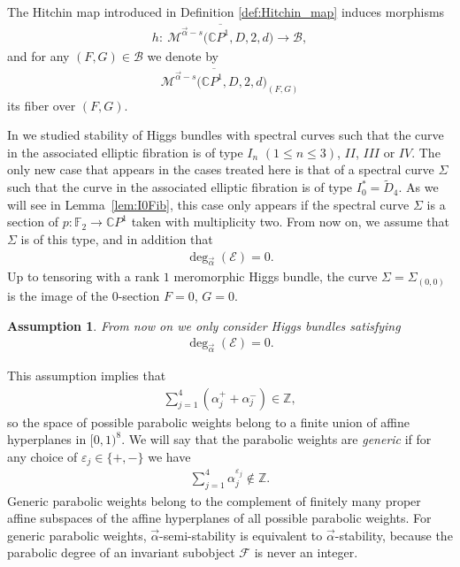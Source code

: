 \documentclass[pdftex]{sigma}
\newcommand{\Z}{{\mathbb Z}} %
\newcommand{\CP}[1]{\mathbb{C}P^{#1}} %
\newcommand{\E}{{\mathcal E}} %
\newcommand{\F}{{\mathcal F}} %
\newcommand{\Mod}{{\mathcal M}} %
\newcommand{\pardeg}{\deg_{\vec{\alpha}}}
\numberwithin{equation}{section}
\newtheorem{assn}[prop]{Assumption}
{ \theoremstyle{definition}
\newtheorem{defn}[prop]{Definition}
\newtheorem{Example}[prop]{Example}
\newtheorem{Remark}[prop]{Remark}}
\begin{document}
The Hitchin map introduced in Definition \ref{def:Hitchin_map} induces morphisms
\begin{gather*}
 h\colon \ {\overline{\Mod^{\vec{\alpha}-s} \big(\CP1, D, 2,d \big)}} \to \mathcal{B},
\end{gather*}
and for any $(F,G) \in \mathcal{B}$ we denote by
\begin{gather*}
 {\overline{\Mod^{\vec{\alpha}-s} \big(\CP1, D, 2,d \big)}}_{(F,G)}
\end{gather*}
its fiber over $(F,G)$.

In \cite{ISS, ISS2} we studied stability of Higgs bundles with spectral curves such that the curve in the associated elliptic fibration is of type $I_n$ $(1 \leq n \leq 3)$, $II$, $III$ or $IV$. The only new case that appears in the cases treated here is that of a spectral curve $\Sigma$ such that the curve in the associated elliptic fibration is of type $I_0^* = \tilde{D}_4$. As we will see in Lemma~\ref{lem:I0Fib}, this case only appears if the spectral curve $\Sigma$ is a section of $p\colon {\mathbb {F}}_2 \to \CP1$ taken with multiplicity two. From now on, we assume that $\Sigma$ is of this type, and in addition that
\begin{gather*}%
 \pardeg (\E ) = 0.
\end{gather*}
Up to tensoring with a rank $1$ meromorphic Higgs bundle, the curve $\Sigma = \Sigma_{(0,0)}$ is the image of the $0$-section $F = 0$, $G = 0$.

 \begin{assn} From now on we only consider Higgs bundles satisfying
 \begin{gather*}
 \pardeg (\E ) = 0.
 \end{gather*}
 \end{assn}

This assumption implies that
\begin{gather*}
 \sum_{j=1}^4 (\alpha_j^+ + \alpha_j^-) \in \Z,
\end{gather*}
so the space of possible parabolic weights belong to a finite union of affine hyperplanes in $[0,1)^8$.
We will say that the parabolic weights are {\it generic} if for any choice of $\varepsilon_j \in \{ +, - \}$ we have
\begin{gather*}
 \sum_{j=1}^4 \alpha_j^{\varepsilon_j} \notin \Z.
\end{gather*}
Generic parabolic weights belong to the complement of finitely many proper affine subspaces of the affine hyperplanes of all possible parabolic weights.
For generic parabolic weights, $\vec{\alpha}$-semi-stability is equivalent to $\vec{\alpha}$-stability, because the parabolic degree of an invariant subobject
$\F$ is never an integer.
\end{document}
